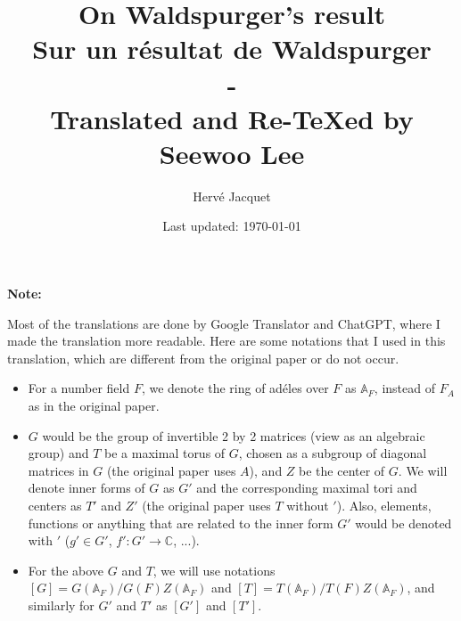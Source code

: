 \documentclass[letterpaper, 12pt]{article}
\newcommand{\1}{\mathds{1}}	%
\newcommand{\Aa}{\mathbb{A}}
\theoremstyle{definition}
\numberwithin{equation}{subsection}
\numberwithin{theorem}{subsection}
\numberwithin{proposition}{section}
\numberwithin{lemma}{section}
\numberwithin{definition}{subsection}
\begin{document}

\title{On Waldspurger's result \\[1em]
\normalsize Sur un r\'esultat de Waldspurger\\ - \\
\normalsize Translated and Re-\TeX ed by Seewoo Lee}


\author{Herv\'e Jacquet}
\date{\normalsize\vspace{-1ex} Last updated: \today}


\maketitle





\tableofcontents

\newpage

\textbf{Note:} 

Most of the translations are done by Google Translator and ChatGPT, where I made the translation more readable.
Here are some notations that I used in this translation, which are different from the original paper or do not occur.

\begin{itemize}
    \item For a number field $F$, we denote the ring of ad\'eles over $F$ as $\Aa_F$, instead of $F_A$ as in the original paper.
    \item $G$ would be the group of invertible 2 by 2 matrices (view as an algebraic group) and $T$ be a maximal torus of $G$, chosen as a subgroup of diagonal matrices in $G$ (the original paper uses $A$), and $Z$ be the center of $G$.
    We will denote inner forms of $G$ as $G'$ and the corresponding maximal tori and centers as $T'$ and $Z'$ (the original paper uses $T$ without $'$).
    Also, elements, functions or anything that are related to the inner form $G'$ would be denoted with $'$ ($g' \in G'$, $f': G' \to \mathbb{C}$, ...).
    \item For the above $G$ and $T$, we will use notations $[G] = G(\Aa_F) / G(F)Z(\Aa_F)$ and $[T] = T(\Aa_F) / T(F) Z(\Aa_F)$, and similarly for $G'$ and $T'$ as $[G']$ and $[T']$.
\end{itemize}
\end{document}
